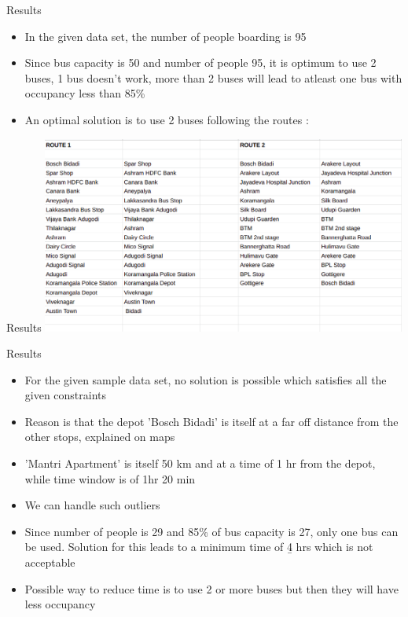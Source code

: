 \documentclass{beamer}
\begin{document}
\begin{frame}{Results}
\begin{itemize}[<+- | alert@+>]
\item In the given data set, the number of people boarding is 95
\item Since bus capacity is 50 and number of people 95, it is optimum to use 2 buses, 1 bus doesn't work, more than 2 buses will lead to atleast one bus with occupancy less than 85\%
\item An optimal solution is to use 2 buses following the routes :

\end{itemize}
\end{frame}

\begin{frame}{Results}
\includegraphics[width=0.9\textwidth]{bus_routes.png}
\end{frame}


\begin{frame}{Results}
\begin{itemize}
\item For the given sample data set, no solution is possible which satisfies all the given constraints
\item Reason is that the depot 'Bosch Bidadi' is itself at a far off distance from the other stops, explained on maps
\item 'Mantri Apartment' is itself 50 km and at a time of 1 hr from the depot, while time window is of 1hr 20 min
\item We can handle such outliers
\item Since number of people is 29 and 85\% of bus capacity is 27, only one bus can be used. Solution for this leads to a minimum time of \b{4 hrs} which is not acceptable
\item Possible way to reduce time is to use 2 or more buses but then they will have less occupancy

\end{itemize}
\end{frame}
\end{document}
